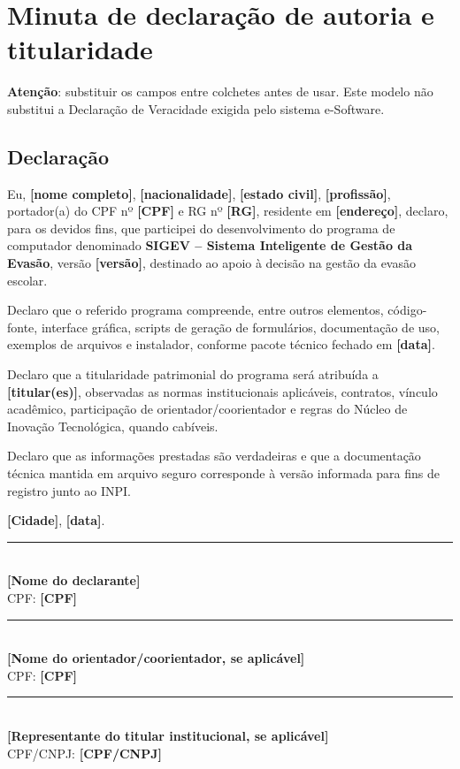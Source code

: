 \section{Minuta de declaração de autoria e titularidade}

\textbf{Atenção}: substituir os campos entre colchetes antes de usar. Este modelo não substitui a Declaração de Veracidade exigida pelo sistema e-Software.

\subsection*{Declaração}

Eu, \textbf{[nome completo]}, \textbf{[nacionalidade]}, \textbf{[estado civil]}, \textbf{[profissão]}, portador(a) do CPF nº \textbf{[CPF]} e RG nº \textbf{[RG]}, residente em \textbf{[endereço]}, declaro, para os devidos fins, que participei do desenvolvimento do programa de computador denominado \textbf{SIGEV -- Sistema Inteligente de Gestão da Evasão}, versão \textbf{[versão]}, destinado ao apoio à decisão na gestão da evasão escolar.

Declaro que o referido programa compreende, entre outros elementos, código-fonte, interface gráfica, scripts de geração de formulários, documentação de uso, exemplos de arquivos e instalador, conforme pacote técnico fechado em \textbf{[data]}.

Declaro que a titularidade patrimonial do programa será atribuída a \textbf{[titular(es)]}, observadas as normas institucionais aplicáveis, contratos, vínculo acadêmico, participação de orientador/coorientador e regras do Núcleo de Inovação Tecnológica, quando cabíveis.

Declaro que as informações prestadas são verdadeiras e que a documentação técnica mantida em arquivo seguro corresponde à versão informada para fins de registro junto ao INPI.

\vspace{1.5cm}

\noindent \textbf{[Cidade]}, \textbf{[data]}.

\vspace{2cm}

\noindent\rule{0.8\textwidth}{0.4pt}\\
\textbf{[Nome do declarante]}\\
CPF: \textbf{[CPF]}

\vspace{1.5cm}

\noindent\rule{0.8\textwidth}{0.4pt}\\
\textbf{[Nome do orientador/coorientador, se aplicável]}\\
CPF: \textbf{[CPF]}

\vspace{1.5cm}

\noindent\rule{0.8\textwidth}{0.4pt}\\
\textbf{[Representante do titular institucional, se aplicável]}\\
CPF/CNPJ: \textbf{[CPF/CNPJ]}
